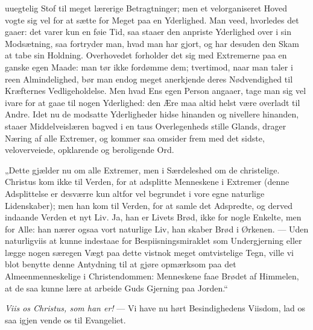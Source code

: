 \documentclass[12pt,a4paper]{book}
\begin{document}
uuegtelig Stof til meget lærerige Betragtninger; men et velorganiseret Hoved
vogte sig vel for at sætte for Meget paa en Yderlighed. Man veed, hvorledes det
gaaer: det varer kun en føie Tid, saa staaer den anpriste Yderlighed over i sin
Modsætning, saa fortryder man, hvad man har gjort, og har
desuden den Skam at tabe sin Holdning. Overhovedet forholder det sig med
Extremerne paa en ganske egen Maade: man tør ikke fordømme dem; tvertimod, naar
man taler i reen Almindelighed, bør man endog meget anerkjende deres
Nødvendighed til Kræfternes Vedligeholdelse. Men hvad Ens egen Person angaaer,
tage man sig vel ivare for at gaae til nogen Yderlighed: den Ære maa altid helst
være overladt til Andre. Idet nu de modsatte Yderligheder hidse hinanden og
nivellere hinanden, staaer Middelveislæren bagved i en taus Overlegenheds stille
Glands, drager Næring af alle Extremer, og kommer saa omsider frem med det
sidste, veloverveiede, opklarende og beroligende Ord.

„Dette gjælder nu om alle Extremer, men i Særdeleshed om de christelige.
Christus kom ikke til Verden, for at adsplitte Menneskene i Extremer (denne
Adsplittelse er desværre kun altfor vel begrundet i vore egne naturlige
Lidenskaber); men han kom til Verden, for at samle det Adspredte, og derved
indaande Verden et nyt Liv. Ja, han er Livets Brød, ikke for nogle Enkelte, men
for Alle: han nærer ogsaa vort naturlige Liv, han skaber Brød i Ørkenen. ---
Uden naturligviis at kunne indestaae for Bespiisningsmiraklet som Undergjerning
eller lægge nogen særegen Vægt paa dette vistnok meget omtvistelige Tegn, ville
vi blot benytte denne Antydning til at gjøre opmærksom paa det Almeenmenneskelige
i Christendommen: Menneskene faae Brødet af Himmelen, at de saa kunne lære at
arbeide Guds Gjerning paa Jorden.“

\emph{Viis os Christus, som han er!} --- Vi have nu hørt Besindighedens Viisdom,
lad os saa igjen vende os til Evangeliet.
\end{document}
